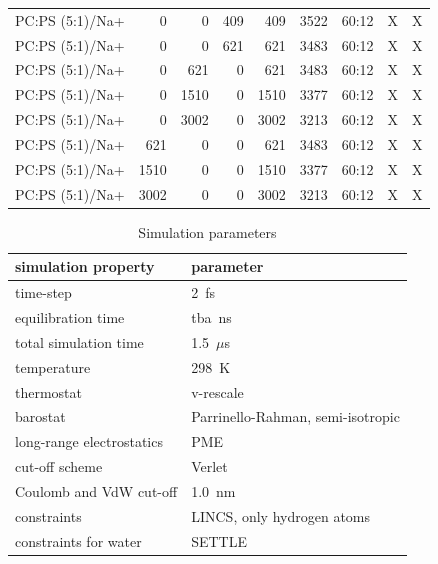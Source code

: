 \documentclass[journal=jpcbfk,manuscript=article]{achemso}
\begin{document}
\begin{table}[tbp]
\begin{tabular}{l | r r r r | r r | c c }
PC:PS (5:1)/Na+  &      0  &      0  &    409  &    409  &  3522  &  60:12  &  X  &  X  \\ 
PC:PS (5:1)/Na+  &      0  &      0  &    621  &    621  &  3483  &  60:12  &  X  &  X  \\ 
PC:PS (5:1)/Na+  &      0  &    621  &      0  &    621  &  3483  &  60:12  &  X  &  X  \\ 
PC:PS (5:1)/Na+  &      0  &   1510  &      0  &   1510  &  3377  &  60:12  &  X  &  X  \\ 
PC:PS (5:1)/Na+  &      0  &   3002  &      0  &   3002  &  3213  &  60:12  &  X  &  X  \\ 
PC:PS (5:1)/Na+  &    621  &      0  &      0  &    621  &  3483  &  60:12  &  X  &  X  \\ 
PC:PS (5:1)/Na+  &   1510  &      0  &      0  &   1510  &  3377  &  60:12  &  X  &  X  \\ 
PC:PS (5:1)/Na+  &   3002  &      0  &      0  &   3002  &  3213  &  60:12  &  X  &  X  \\ 
  \hline
\end{tabular}
\end{table}



\begin{table}[tbp]
  \caption{Simulation parameters}
  \label{tbl:mdpar}
  \begin{tabular}{ll}
    simulation property & parameter   \\
    \hline
    time-step           & 2~fs         \\
    equilibration time  & tba~ns  \\
    total simulation time     & 1.5~$\mu$s  \\
    temperature         & 298~K       \\
    thermostat          & v-rescale  \cite{bussi07}   \\
    barostat            & Parrinello-Rahman, semi-isotropic \cite{parrinello81} \\
    long-range electrostatics & PME  \cite{darden93}  \\
    cut-off scheme      & Verlet \cite{Pall13}      \\
    Coulomb and VdW cut-off & 1.0~nm \\
    constraints         & LINCS, only hydrogen atoms \cite{hess97} \\
    constraints for water & SETTLE  \cite{miyamoto92} \\
    \hline
  \end{tabular}
\end{table}
 
\end{document}
